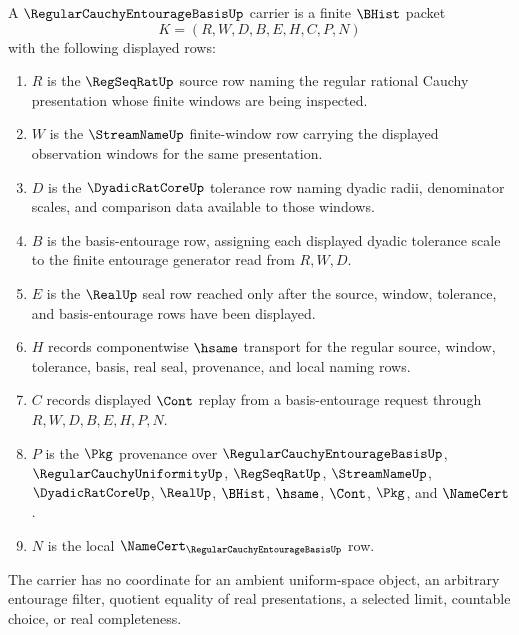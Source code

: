 \begin{definition}
\label{def:regular-cauchy-entourage-basis-carrier}
A $\RegularCauchyEntourageBasisUp$ carrier is a finite $\BHist$ packet
$$
K=(R,W,D,B,E,H,C,P,N)
$$
with the following displayed rows:
\begin{enumerate}
\item $R$ is the $\RegSeqRatUp$ source row naming the regular rational Cauchy presentation whose finite windows are being inspected.
\item $W$ is the $\StreamNameUp$ finite-window row carrying the displayed observation windows for the same presentation.
\item $D$ is the $\DyadicRatCoreUp$ tolerance row naming dyadic radii, denominator scales, and comparison data available to those windows.
\item $B$ is the basis-entourage row, assigning each displayed dyadic tolerance scale to the finite entourage generator read from $R,W,D$.
\item $E$ is the $\RealUp$ seal row reached only after the source, window, tolerance, and basis-entourage rows have been displayed.
\item $H$ records componentwise $\hsame$ transport for the regular source, window, tolerance, basis, real seal, provenance, and local naming rows.
\item $C$ records displayed $\Cont$ replay from a basis-entourage request through $R,W,D,B,E,H,P,N$.
\item $P$ is the $\Pkg$ provenance over $\RegularCauchyEntourageBasisUp$, $\RegularCauchyUniformityUp$, $\RegSeqRatUp$, $\StreamNameUp$, $\DyadicRatCoreUp$, $\RealUp$, $\BHist$, $\hsame$, $\Cont$, $\Pkg$, and $\NameCert$.
\item $N$ is the local $\NameCert_{\RegularCauchyEntourageBasisUp}$ row.
\end{enumerate}
The carrier has no coordinate for an ambient uniform-space object, an arbitrary entourage filter, quotient equality of real presentations, a selected limit, countable choice, or real completeness.
\end{definition}

